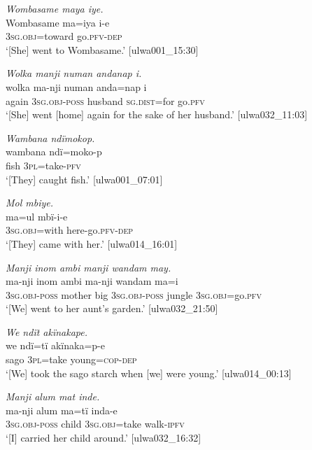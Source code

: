 \ea%
    \label{ex:clause:13}
          \textit{Wombasame maya iye.}\\
\gll    Wombasame  ma=iya      i-e\\
    [name]      \textsc{3sg.obj}=toward  go.\textsc{pfv-dep}\\
\glt `[She] went to Wombasame.’ [ulwa001\_15:30]
\z

\ea%
    \label{ex:clause:14}
          \textit{Wolka manji numan andanap i.}\\
\gll    wolka  ma-nji      numan    anda=nap    i\\
    again  3\textsc{sg.obj-poss}  husband  \textsc{sg.dist}=for  go.\textsc{pfv}\\
\glt `[She] went [home] again for the sake of her husband.’ [ulwa032\_11:03]
\z

\ea%
    \label{ex:clause:15}
          \textit{Wambana ndïmokop.}\\
\gll    wambana  ndï=moko-p\\
    fish    \textsc{3pl}=take-\textsc{pfv}\\
\glt `[They] caught fish.’ [ulwa001\_07:01]
\z

\ea%
    \label{ex:clause:16}
          \textit{Mol mbiye.}\\
\gll    ma=ul      mbï-i-e\\
    3\textsc{sg.obj}=with  here-go.\textsc{pfv{}-dep}\\
\glt `[They] came with her.’ [ulwa014\_16:01]
\z

\ea%
    \label{ex:clause:17}
          \textit{Manji inom ambi manji wandam may.}\\
\gll    ma-nji      inom  ambi  ma-nji      wandam     ma=i\\
    3\textsc{sg.obj-poss}  mother  big    3\textsc{sg.obj-poss}  jungle  3\textsc{sg.obj}=go.\textsc{pfv}\\
\glt `[We] went to her aunt’s garden.’ [ulwa032\_21:50]
\z

\ea%
    \label{ex:clause:18}
          \textit{We ndït akïnakape.}\\
\gll    we    ndï=tï    akïnaka=p-e\\
    sago  3\textsc{pl}=take  young=\textsc{cop{}-dep}\\
\glt `[We] took the sago starch when [we] were young.’ [ulwa014\_00:13]
\z

\ea%
    \label{ex:clause:19}
          \textit{Manji alum mat inde.}\\
\gll    ma-nji      alum  ma=tï      inda-e\\
    3\textsc{sg.obj-poss}  child  3\textsc{sg.obj}=take  walk-\textsc{ipfv}\\
\glt `[I] carried her child around.’ [ulwa032\_16:32]
\z

